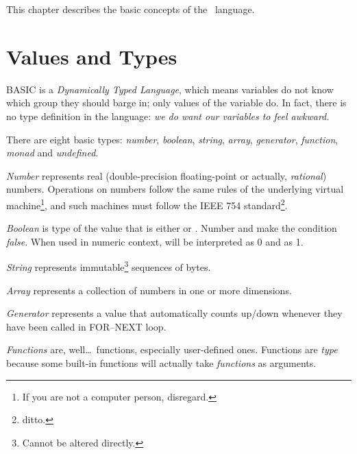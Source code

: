 \quad
{}

This chapter describes the basic concepts of the \tbas\ language.


\section{Values and Types}
\label{valuesandtypes}

BASIC is a \emph{Dynamically Typed Language}, which means variables do not know which group they should barge in; only values of the variable do. In fact, there is no type definition in the language: \emph{we do want our variables to feel awkward.}

There are eight basic types: \emph{number}, \emph{boolean}, \emph{string}, \emph{array}, \emph{generator}, \emph{function}, \emph{monad} and \emph{undefined}.

\emph{Number} represents real (double-precision floating-point or actually, \emph{rational}) numbers. Operations on numbers follow the same rules of the underlying virtual machine\footnote{If you are not a computer person, disregard.}, and such machines must follow the IEEE 754 standard\footnote{ditto.}. 

\emph{Boolean} is type of the value that is either  or . Number  and  make the condition \emph{false}. When used in numeric context,  will be interpreted as 0 and  as 1.

\emph{String} represents immutable\footnote{Cannot be altered directly.} sequences of bytes.

\emph{Array} represents a collection of numbers in one or more dimensions.

\emph{Generator} represents a value that automatically counts up/down whenever they have been called in FOR--NEXT loop.

\emph{Functions} are, well\ldots\ functions, especially user-defined ones. Functions are \emph{type} because some built-in functions will actually take \emph{functions} as arguments.

